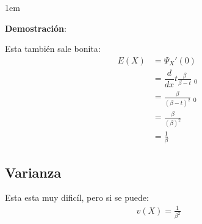 \documentclass[12pt, fleqn]{report}                             %
\newenvironment{SmallIndentation}[1][0.75em]                    %
        {\begin{adjustwidth}{#1}{}\begin{footnotesize}}             %
        {\end{footnotesize}\end{adjustwidth}}                       %
\theoremstyle{break}                                            %
\newcommand \MiniDerivate[1][x] {\dfrac{d}{d #1}}               %
\DeclareMathOperator \Evaluate  {\Big|}                         %
\begin{document}
                \begin{SmallIndentation}[1em]
                    \textbf{Demostración}:
                    
                    Esta también sale bonita:
                    \begin{align*}
                        E(X)
                            &= \Psi_X' (0)                                              \\
                            &= \MiniDerivate{t} \frac{\beta}{\beta - t} \Evaluate_0     \\
                            &= \frac{\beta}{(\beta - t)^2} \Evaluate_0                  \\
                            &= \frac{\beta}{(\beta)^2}                                  \\
                            &= \frac{1}{\beta}
                    \end{align*}
                    
                \end{SmallIndentation}

            \vspace{1em}
            \subsection{Varianza}

                Esta esta muy dificíl, pero si se puede:
                \begin{align*}
                    v(X) = \frac{1}{\beta^2}
                \end{align*}
\end{document}
